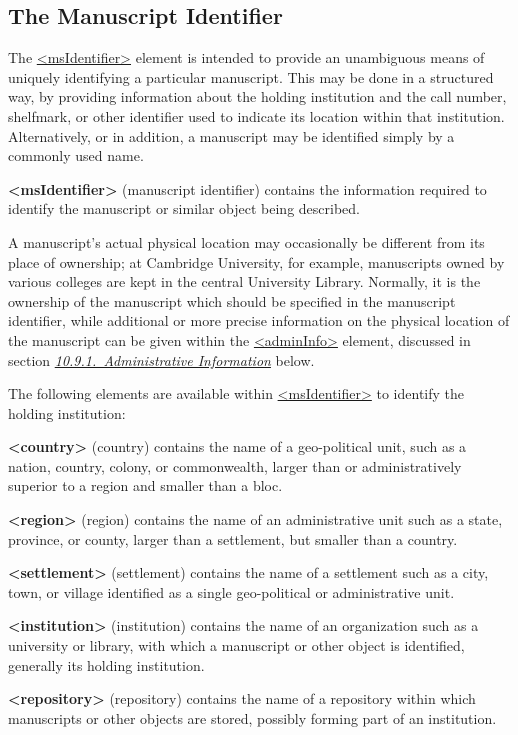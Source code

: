 \subsection[{The Manuscript Identifier}]{The Manuscript Identifier}\label{msid}\par
The \hyperref[TEI.msIdentifier]{<msIdentifier>} element is intended to provide an unambiguous means of uniquely identifying a particular manuscript. This may be done in a structured way, by providing information about the holding institution and the call number, shelfmark, or other identifier used to indicate its location within that institution. Alternatively, or in addition, a manuscript may be identified simply by a commonly used name. 
\begin{sansreflist}
  
\item [\textbf{<msIdentifier>}] (manuscript identifier) contains the information required to identify the manuscript or similar object being described.
\end{sansreflist}
\par
A manuscript's actual physical location may occasionally be different from its place of ownership; at Cambridge University, for example, manuscripts owned by various colleges are kept in the central University Library. Normally, it is the ownership of the manuscript which should be specified in the manuscript identifier, while additional or more precise information on the physical location of the manuscript can be given within the \hyperref[TEI.adminInfo]{<adminInfo>} element, discussed in section \textit{\hyperref[msadad]{10.9.1.\ Administrative Information}} below.\par
The following elements are available within \hyperref[TEI.msIdentifier]{<msIdentifier>} to identify the holding institution: 
\begin{sansreflist}
  
\item [\textbf{<country>}] (country) contains the name of a geo-political unit, such as a nation, country, colony, or commonwealth, larger than or administratively superior to a region and smaller than a bloc.
\item [\textbf{<region>}] (region) contains the name of an administrative unit such as a state, province, or county, larger than a settlement, but smaller than a country.
\item [\textbf{<settlement>}] (settlement) contains the name of a settlement such as a city, town, or village identified as a single geo-political or administrative unit.
\item [\textbf{<institution>}] (institution) contains the name of an organization such as a university or library, with which a manuscript or other object is identified, generally its holding institution.
\item [\textbf{<repository>}] (repository) contains the name of a repository within which manuscripts or other objects are stored, possibly forming part of an institution.
\end{sansreflist}
